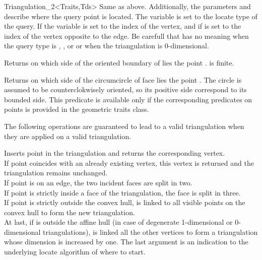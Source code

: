 \begin{ccRefClass}{Triangulation_2<Traits,Tds>}
{Same as above. Additionally, the parameters 
 and 
describe where the query point is located. 
The variable  is set to the locate type of the query.
If  
the variable 
is set to the index of the vertex, and if 
is set to the index 
of the vertex opposite to the
edge. 
Be carefull that 
has no meaning when the query type is , , 
or  or when the
triangulation is $0$-dimensional.}

{Returns on which side of the oriented boundary of  lies 
the point . \ccPrecond {} is finite.}

{Returns on which side of the circumcircle  of face  lies 
the point . The circle is assumed to be counterclokwisely
oriented, so its positive
side correspond to its bounded side.
This predicate is available only if the corresponding predicates on
points is provided in the geometric traits class.}


The following operations are guaranteed to lead to a valid triangulation 
when they are applied on a valid triangulation.




{Inserts point  in the triangulation and returns the corresponding
 vertex.\\
If point  coincides with an already existing vertex, this 
vertex is returned and the triangulation remains unchanged.\\
If point  is on an edge, the two incident faces are split 
in two.\\
If point  is strictly inside a face of the triangulation,
the face is split in three.\\
If point  is strictly outside the  convex hull,  is linked
to all visible points on the convex hull to form the new
triangulation.\\
At last, if  is outside the affine hull (in case of degenerate
1-dimensional or 0-dimensional triangulations), 
is linked all the  other vertices to form a triangulation whose
dimension is increased by one.
The last argument  is an indication to the underlying locate
algorithm of where to start.
}



\end{ccRefClass}
